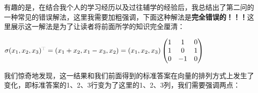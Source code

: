 有趣的是，在结合我个人的学习经历以及过往辅学的经验后，我总结出了第二问的一种常见的错误解法，这里我需要加粗强调，下面这种解法是\textbf{完全错误的！！！}这里展示这一解法是为了让读者将前面所学的知识完全厘清：

\begin{solution}[错误解法！！！]
    $
        \sigma(x_1,x_2,x_3)^{\color{lightgray}\mathrm{T}}
        =(x_1+x_2,x_1-x_3, x_2)=(x_1,x_2,x_3)\begin{pmatrix}
            1 & 1  & 0 \\
            1 & 0  & 1 \\
            0 & -1 & 0
        \end{pmatrix}
    $
\end{solution}

我们惊奇地发现，这一结果和我们前面得到的标准答案在向量的排列方式上发生了变化，即标准答案的1、2、3行变为了这里的1、2、3列，我们需要强调两点：
